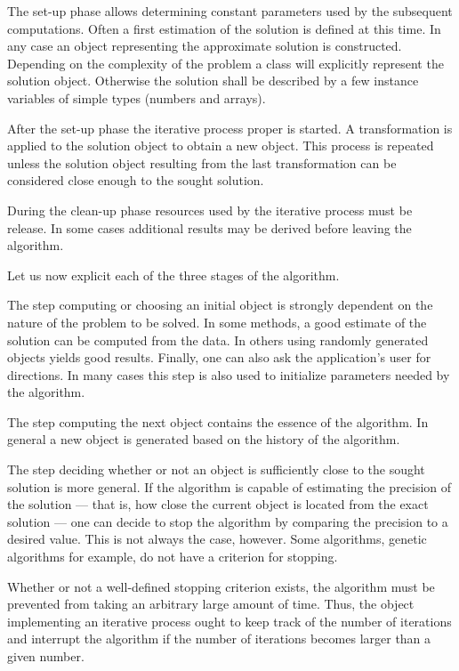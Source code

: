 The set-up phase allows determining constant parameters used by
the subsequent computations. Often a first estimation of the
solution is defined at this time. In any case an object
representing the approximate solution is constructed. Depending on
the complexity of the problem a class will explicitly represent
the solution object. Otherwise the solution shall be described by
a few instance variables of simple types (numbers and arrays).

After the set-up phase the iterative process proper is started. A
transformation is applied to the solution object to obtain a new
object. This process is repeated unless the solution object
resulting from the last transformation can be considered close
enough to the sought solution.

During the clean-up phase resources used by the iterative process
must be release. In some cases additional results may be derived
before leaving the algorithm.

\noindent Let us now explicit each of the three stages of the
algorithm.

The step computing or choosing an initial object is strongly
dependent on the nature of the problem to be solved. In some
methods, a good estimate of the solution can be computed from the
data. In others using randomly generated objects yields good
results. Finally, one can also ask the application's user for
directions. In many cases this step is also used to initialize
parameters needed by the algorithm.

The step computing the next object contains the essence of the
algorithm. In general a new object is generated based on the
history of the algorithm.

The step deciding whether or not an object is sufficiently close
to the sought solution is more general. If the algorithm is
capable of estimating the precision of the solution --- that is,
how close the current object is located from the exact solution
--- one can decide to stop the algorithm by comparing the
precision to a desired value. This is not always the case,
however. Some algorithms, genetic algorithms for example, do not
have a criterion for stopping.

Whether or not a well-defined stopping criterion exists, the
algorithm must be prevented from taking an arbitrary large amount
of time. Thus, the object implementing an iterative process ought
to keep track of the number of iterations and interrupt the
algorithm if the number of iterations becomes larger than a given
number.

